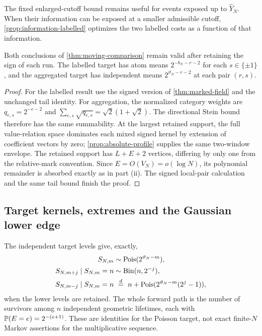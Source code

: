 The fixed enlarged-cutoff bound remains useful for events exposed up to
$\widehat Y_N$. When their information can be exposed at a smaller
admissible cutoff, \cref{prop:information-labelled} optimizes the two
labelled costs as a function of that information.

\begin{corollary}\label{cor:signed-growing}
Both conclusions of \cref{thm:moving-comparison} remain valid after retaining
the sign of each run. The labelled target has atom means $2^{-b_N-r-2}$
for each $s\in\{\pm1\}$, and the aggregated target has independent means
$2^{\vartheta_N-r-2}$ at each pair $(r,s)$.
\end{corollary}
\begin{proof}
For the labelled result use the signed version of \cref{thm:marked-field}
and the unchanged tail identity. For aggregation, the normalized category
weights are $q_{e,s}=2^{-e-2}$ and
$\sum_{e,s}\sqrt{q_{e,s}}=\sqrt2(1+\sqrt2)$.
The directional Stein bound therefore has the same summability.
At the largest retained support, the full value-relation space dominates
each mixed signed kernel by extension of coefficient vectors by zero;
\cref{prop:absolute-profile} supplies the same two-window envelope.
The retained support has $L+E+2$ vertices, differing by only one from the
relative-mark convention. Since $E=O(V_N)=o(\log N)$, its polynomial
remainder is absorbed exactly as in part (ii). The signed local-pair calculation and the same tail bound finish
the proof.
\end{proof}

\subsection{Target kernels, extremes and the Gaussian lower edge}
The independent target levels give, exactly,
\begin{align}
 S_{N,m}&\sim\operatorname{Pois}(2^{\vartheta_N-m}),\label{eq:target-marginal}\\
 S_{N,m+j}\mid S_{N,m}=n&\sim\operatorname{Bin}(n,2^{-j}),\label{eq:target-forward}\\
 S_{N,m-j}\mid S_{N,m}=n&\ \stackrel d=\ n+
      \operatorname{Pois}(2^{\vartheta_N-m}(2^j-1)),\label{eq:target-reverse}
\end{align}
when the lower levels are retained. The whole forward path is the number
of survivors among $n$ independent geometric lifetimes, each with
$\mathbb P(E=e)=2^{-(e+1)}$. These are identities for the Poisson target, not
exact finite-$N$ Markov assertions for the multiplicative sequence.

